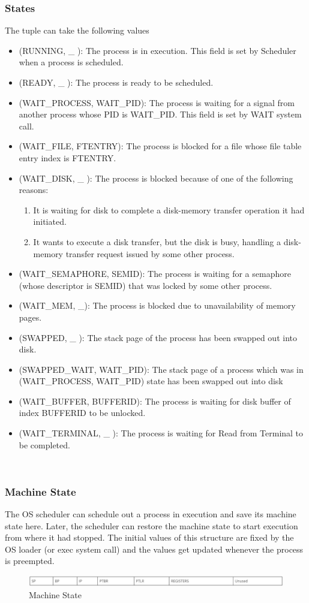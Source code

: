 \subsubsection {States}
The tuple can take the following values
\begin {itemize}
\item (RUNNING, \_ ): The process is in execution. This field is set by Scheduler when a process is scheduled.
\item (READY,  \_ ): The process is ready to be scheduled.
\item (WAIT\_PROCESS, WAIT\_PID): The process is waiting for a signal from another process whose PID is WAIT\_PID. This field is set by WAIT system call.
\item (WAIT\_FILE, FTENTRY): The process is blocked for a file whose file table entry index is FTENTRY.
\item (WAIT\_DISK,  \_ ): The process is blocked because of one of the following reasons:
\begin{enumerate}
\item It is waiting for disk to complete a disk-memory transfer operation it had initiated.
\item It wants to execute a disk transfer, but the disk is busy, handling a disk-memory transfer request issued by some other process.
\end{enumerate}
\item (WAIT\_SEMAPHORE, SEMID): The process is waiting for a semaphore (whose descriptor is SEMID) that was locked by some other process.
\item (WAIT\_MEM, \_): The process is blocked due to unavailability of memory pages.
\item (SWAPPED,  \_ ): The stack page of the process has been swapped out into disk.
\item (SWAPPED\_WAIT, WAIT\_PID): The stack page of a process which was in (WAIT\_PROCESS, WAIT\_PID) state has been swapped out into disk
\item (WAIT\_BUFFER, BUFFERID): The process is waiting for disk buffer of index BUFFERID to be unlocked.
\item (WAIT\_TERMINAL, \_ ): The process is waiting for Read from Terminal to be completed.
\end {itemize}
\\

\subsubsection {Machine State}
The OS scheduler can schedule out a process in execution and save its machine state here. Later, the scheduler can restore the machine state to start execution from where it had stopped. The initial values of this structure are fixed by the OS loader (or exec system call) and the values get updated whenever the process is preempted.
\begin{figure}[ht]
\centering
\includegraphics  [scale=0.55]{figures/ms.png}
\caption{\footnotesize Machine State}
\end{figure}

